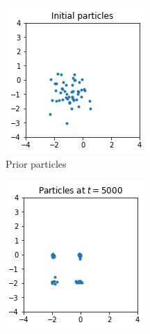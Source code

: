 \begin{figure}[!htb]
    \centering
    \begin{subfigure}[b]{0.2\textwidth}
        \includegraphics[width=\textwidth]{img/init.png}
        \caption{Prior particles}
        \label{fig:gull}
    \end{subfigure}
    \begin{subfigure}[b]{0.2\textwidth}
        \includegraphics[width=\textwidth]{img/sgld.png}

\end{subfigure}
\end{figure}
